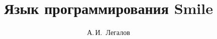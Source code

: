 \documentclass [a4paper, 12pt, oneside]{scrbook}
\begin{document}
\renewcommand\figurename{Рисунок}

\title{\Huge{Язык программирования Smile}}
\author {\Large{А.\,И.~Легалов}}
\maketitle

\tableofcontents

















\end{document}
